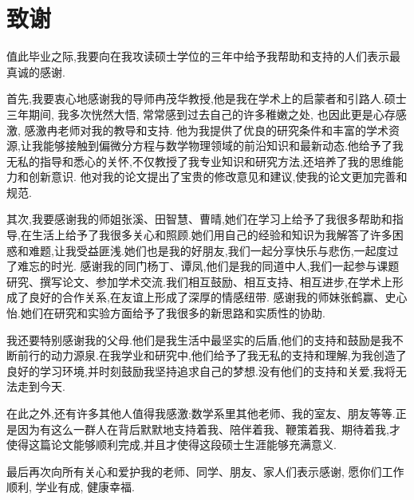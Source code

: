 \chapter{致谢}
值此毕业之际,我要向在我攻读硕士学位的三年中给予我帮助和支持的人们表示最真诚的感谢.

首先,我要衷心地感谢我的导师冉茂华教授,他是我在学术上的启蒙者和引路人.硕士三年期间, 我多次恍然大悟, 常常感到过去自己的许多稚嫩之处, 也因此更是心存感激, 感激冉老师对我的教导和支持.
他为我提供了优良的研究条件和丰富的学术资源,让我能够接触到偏微分方程与数学物理领域的前沿知识和最新动态.他给予了我无私的指导和悉心的关怀,不仅教授了我专业知识和研究方法,还培养了我的思维能力和创新意识.
他对我的论文提出了宝贵的修改意见和建议,使我的论文更加完善和规范.

其次,我要感谢我的师姐张溪、田智慧、曹晴,她们在学习上给予了我很多帮助和指导,在生活上给予了我很多关心和照顾.她们用自己的经验和知识为我解答了许多困惑和难题,让我受益匪浅.她们也是我的好朋友,我们一起分享快乐与悲伤,一起度过了难忘的时光.
感谢我的同门杨丁、谭凤,他们是我的同道中人,我们一起参与课题研究、撰写论文、参加学术交流.我们相互鼓励、相互支持、相互进步,在学术上形成了良好的合作关系,在友谊上形成了深厚的情感纽带.
感谢我的师妹张鹤赢、史心怡.她们在研究和实验方面给予了我很多的新思路和实质性的协助.

我还要特别感谢我的父母.他们是我生活中最坚实的后盾,他们的支持和鼓励是我不断前行的动力源泉.在我学业和研究中,他们给予了我无私的支持和理解,为我创造了良好的学习环境,并时刻鼓励我坚持追求自己的梦想.没有他们的支持和关爱,我将无法走到今天.

在此之外,还有许多其他人值得我感激:数学系里其他老师、我的室友、朋友等等.正是因为有这么一群人在背后默默地支持着我、陪伴着我、鞭策着我、期待着我,才使得这篇论文能够顺利完成,并且才使得这段硕士生涯能够充满意义.

最后再次向所有关心和爱护我的老师、同学、朋友、家人们表示感谢, 愿你们工作顺利, 学业有成, 健康幸福.

